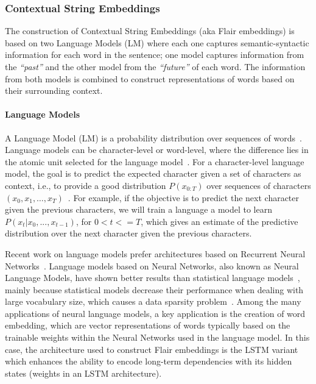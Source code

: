 \subsubsection{Contextual String Embeddings}
\label{cap3:infExtr/sequenceLabeling/contextualEmbeddings}
The construction of Contextual String Embeddings (aka Flair embeddings) is based on two 
Language Models (LM) where each one captures semantic-syntactic information for each word in 
the sentence; one model captures information from the \textit{“past”} and the other model from 
the \textit{“future”} of each word. The information from both models is combined to construct 
representations of words based on their surrounding context.

\paragraph{Language Models}
\label{cap3:infExtr/sequenceLabeling/contextualEmbeddings/languageModel}
A Language Model (LM) is a probability distribution over sequences of words~\cite{seqlab:PonteC98}. 
Language models can be character-level or word-level, where the difference lies in the atomic 
unit selected for the language model~\cite{seqlab:PonteC98}. For a character-level language model, 
the goal is to predict the expected character given a set of characters as context, i.e., to 
provide a good distribution $P(x_{0:T})$  over sequences of characters 
$(x_0, x_1,\ldots,x_T)$~\cite{seqlab:Graves13}. For example, if the objective is to predict the 
next character given the previous characters, we will train a language a model to learn 
$P(x_t|x_0,..., x_{t-1})$, for $0 < t <= T$, which gives an estimate of the predictive 
distribution over the next character given the previous characters.

Recent work on language models prefer architectures based on Recurrent Neural Networks~\cite{seqlab:contextual-emb-AkbikBV18}. 
Language models based on Neural Networks, also known as Neural Language Models, have shown 
better results than statistical language models~\cite{seqlab:Graves13}, mainly because 
statistical models decrease their performance when dealing with large vocabulary size, which 
causes a data sparsity problem~\cite{seqlab:Egghe07a}. Among the many applications of neural 
language models, a key application is the creation of word embedding, which are vector 
representations of words typically based on the trainable weights within the Neural Networks 
used in the language model. In this case, the architecture used to construct Flair embeddings 
is the LSTM variant~\cite{seqlab:HochreiterS97,seqlab:Graves13,seqlab:ZarembaSV14} which 
enhances the ability to encode long-term dependencies with its hidden states (weights in an LSTM 
architecture).

